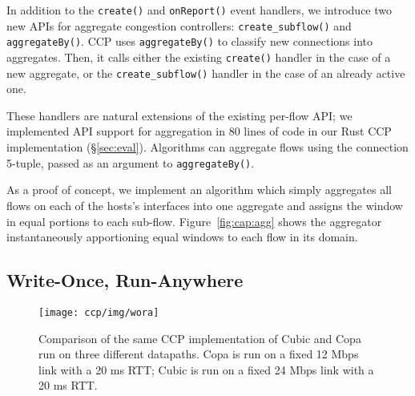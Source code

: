 

%

 In addition to the \texttt{create()} and \texttt{onReport()} event handlers, we introduce two new APIs for aggregate congestion controllers: \texttt{create\_subflow()} and \texttt{aggregateBy()}.
CCP uses \texttt{aggregateBy()} to classify new connections into aggregates. Then, it calls either the existing \texttt{create()} handler in the case of a new aggregate, or the \texttt{create\_subflow()} handler in the case of an already active one.

These handlers are natural extensions of the existing per-flow API; we implemented API support for aggregation in $80$ lines of code in our Rust CCP implementation (\S\ref{sec:eval}).
Algorithms can aggregate flows using the connection 5-tuple, passed as an argument to \texttt{aggregateBy()}.

As a proof of concept, we implement an algorithm which simply aggregates all flows on each of the hosts's interfaces into one aggregate and assigns the window in equal portions to each sub-flow.
Figure~\ref{fig:cap:agg} shows the aggregator instantaneously apportioning equal windows to each flow in its domain.

\subsection{Write-Once, Run-Anywhere}
\label{s:capabilities:wora}
\begin{figure}
    \centering
    \texttt{[image: ccp/img/wora]}
    \caption{Comparison of the same CCP implementation of Cubic and Copa run on three different datapaths. Copa is run on a fixed 12 Mbps link with a 20 ms RTT; Cubic is run on a fixed 24 Mbps link with a 20 ms RTT.}\label{fig:datapaths:wora}
\end{figure}


